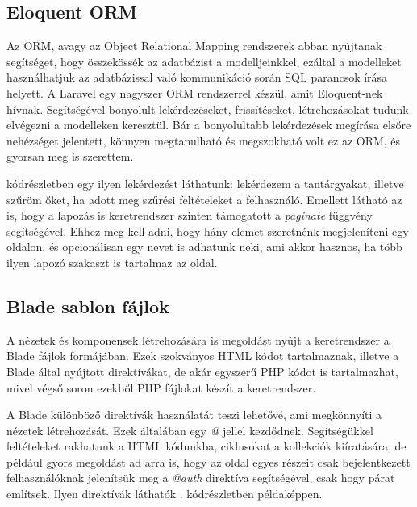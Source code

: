 \documentclass[
]{thesis-ekf}
\theoremstyle{definition}
\theoremstyle{remark}
\begin{document}
\subsection{Eloquent ORM}

Az ORM, avagy az Object Relational Mapping rendszerek abban nyújtanak segítséget, hogy összekössék az adatbázist a modelljeinkkel, ezáltal a modelleket használhatjuk az adatbázissal való kommunikáció során SQL parancsok írása helyett.\cite{orm} A Laravel egy nagyszer ORM rendszerrel készül, amit Eloquent-nek\cite{eloquentORM} hívnak. Segítségével bonyolult lekérdezéseket, frissítéseket, létrehozásokat tudunk elvégezni a modelleken keresztül. Bár a bonyolultabb lekérdezések megírása elsőre nehézséget jelentett, könnyen megtanulható és megszokható volt ez az ORM, és gyorsan meg is szerettem.

 kódrészletben egy ilyen lekérdezést láthatunk: lekérdezem a tantárgyakat, illetve szűröm őket, ha adott meg szűrési feltételeket a felhasználó. Emellett látható az is, hogy a lapozás is keretrendszer szinten támogatott a \emph{paginate} függvény segítségével. Ehhez meg kell adni, hogy hány elemet szeretnénk megjeleníteni egy oldalon, és opcionálisan egy nevet is adhatunk neki, ami akkor hasznos, ha több ilyen lapozó szakaszt is tartalmaz az oldal. 



\subsection{Blade sablon fájlok}
\label{bladeSection}

A nézetek és komponensek létrehozására is megoldást nyújt a keretrendszer a Blade\cite{blade} fájlok formájában. Ezek szokványos HTML kódot tartalmaznak, illetve a Blade által nyújtott direktívákat, de akár egyszerű PHP kódot is tartalmazhat, mivel végső soron ezekből PHP fájlokat készít a keretrendszer.

A Blade különböző direktívák használatát teszi lehetővé, ami megkönnyíti a nézetek létrehozását. Ezek általában egy \emph{@} jellel kezdődnek. Segítségükkel feltételeket rakhatunk a HTML kódunkba, ciklusokat a kollekciók kiíratására, de például gyors megoldást ad arra is, hogy az oldal egyes részeit csak bejelentkezett felhasználóknak jelenítsük meg a \emph{@auth} direktíva segítségével, csak hogy párat említsek. Ilyen direktívák láthatók . kódrészletben példaképpen.
\end{document}
